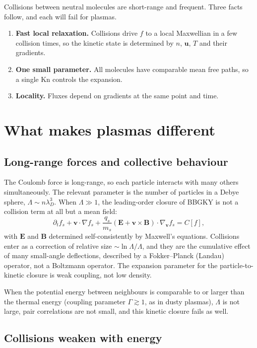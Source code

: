 \documentclass[11pt]{article}
\newcommand{\Kn}{\mathrm{Kn}}
\newcommand{\bu}{\mathbf{u}}
\newcommand{\bv}{\mathbf{v}}
\newcommand{\bE}{\mathbf{E}}
\newcommand{\bB}{\mathbf{B}}
\begin{document}
Collisions between neutral molecules are short-range and frequent. Three
facts follow, and each will fail for plasmas.
\begin{enumerate}
  \item \textbf{Fast local relaxation.} Collisions drive $f$ to a local
    Maxwellian in a few collision times, so the kinetic state is determined
    by $n$, $\bu$, $T$ and their gradients.
  \item \textbf{One small parameter.} All molecules have comparable mean
    free paths, so a single $\Kn$ controls the expansion.
  \item \textbf{Locality.} Fluxes depend on gradients at the same point and
    time.
\end{enumerate}

\section{What makes plasmas different}

\subsection{Long-range forces and collective behaviour}

The Coulomb force is long-range, so each particle interacts with many others
simultaneously. The relevant parameter is the number of particles in a Debye
sphere, $\Lambda \sim n\lambda_D^3$. When $\Lambda \gg 1$, the leading-order
closure of BBGKY is not a collision term at all but a mean field:
\begin{equation}
  \partial_t f_s + \bv\cdot\nabla f_s
  + \frac{q_s}{m_s}\left(\bE + \bv\times\bB\right)\cdot\nabla_{\bv} f_s
  = C[f],
\end{equation}
with $\bE$ and $\bB$ determined self-consistently by Maxwell's equations.
Collisions enter as a correction of relative size $\sim \ln\Lambda/\Lambda$,
and they are the cumulative effect of many small-angle deflections, described
by a Fokker--Planck (Landau) operator, not a Boltzmann operator. The
expansion parameter for the particle-to-kinetic closure is weak coupling, not
low density.

When the potential energy between neighbours is comparable to or larger than
the thermal energy (coupling parameter $\Gamma \gtrsim 1$, as in dusty
plasmas), $\Lambda$ is not large, pair correlations are not small, and this
kinetic closure fails as well.

\subsection{Collisions weaken with energy}
\end{document}
